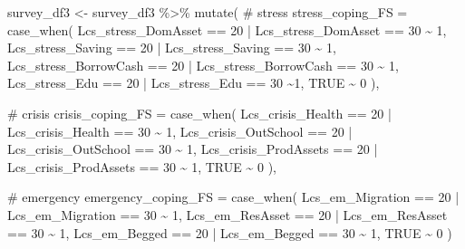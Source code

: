\documentclass[
  letterpaper,
  DIV=11,
  numbers=noendperiod]{scrreprt}
\newenvironment{Shaded}{\begin{snugshade}}{\end{snugshade}}
\newcommand{\AttributeTok}[1]{\textcolor[rgb]{0.40,0.45,0.13}{#1}}
\newcommand{\CommentTok}[1]{\textcolor[rgb]{0.37,0.37,0.37}{#1}}
\newcommand{\ConstantTok}[1]{\textcolor[rgb]{0.56,0.35,0.01}{#1}}
\newcommand{\DecValTok}[1]{\textcolor[rgb]{0.68,0.00,0.00}{#1}}
\newcommand{\FunctionTok}[1]{\textcolor[rgb]{0.28,0.35,0.67}{#1}}
\newcommand{\NormalTok}[1]{\textcolor[rgb]{0.00,0.23,0.31}{#1}}
\newcommand{\OtherTok}[1]{\textcolor[rgb]{0.00,0.23,0.31}{#1}}
\newcommand{\SpecialCharTok}[1]{\textcolor[rgb]{0.37,0.37,0.37}{#1}}
\begin{document}
\begin{Shaded}
\begin{Highlighting}[]
\NormalTok{survey\_df3 }\OtherTok{\textless{}{-}}\NormalTok{ survey\_df3 }\SpecialCharTok{\%\textgreater{}\%} 
  \FunctionTok{mutate}\NormalTok{(}
    \CommentTok{\# stress}
    \AttributeTok{stress\_coping\_FS =} \FunctionTok{case\_when}\NormalTok{(}
\NormalTok{      Lcs\_stress\_DomAsset }\SpecialCharTok{==} \DecValTok{20} \SpecialCharTok{|}\NormalTok{  Lcs\_stress\_DomAsset }\SpecialCharTok{==} \DecValTok{30} \SpecialCharTok{\textasciitilde{}} \DecValTok{1}\NormalTok{,}
\NormalTok{      Lcs\_stress\_Saving }\SpecialCharTok{==} \DecValTok{20} \SpecialCharTok{|}\NormalTok{ Lcs\_stress\_Saving }\SpecialCharTok{==} \DecValTok{30} \SpecialCharTok{\textasciitilde{}} \DecValTok{1}\NormalTok{,}
\NormalTok{      Lcs\_stress\_BorrowCash }\SpecialCharTok{==} \DecValTok{20} \SpecialCharTok{|}\NormalTok{ Lcs\_stress\_BorrowCash }\SpecialCharTok{==} \DecValTok{30} \SpecialCharTok{\textasciitilde{}} \DecValTok{1}\NormalTok{,}
\NormalTok{      Lcs\_stress\_Edu }\SpecialCharTok{==} \DecValTok{20} \SpecialCharTok{|}\NormalTok{ Lcs\_stress\_Edu }\SpecialCharTok{==} \DecValTok{30} \SpecialCharTok{\textasciitilde{}}\DecValTok{1}\NormalTok{,}
      \ConstantTok{TRUE} \SpecialCharTok{\textasciitilde{}} \DecValTok{0}
\NormalTok{    ),}
    
    \CommentTok{\# crisis}
    \AttributeTok{crisis\_coping\_FS =} \FunctionTok{case\_when}\NormalTok{(}
\NormalTok{      Lcs\_crisis\_Health }\SpecialCharTok{==} \DecValTok{20} \SpecialCharTok{|}\NormalTok{  Lcs\_crisis\_Health }\SpecialCharTok{==} \DecValTok{30} \SpecialCharTok{\textasciitilde{}} \DecValTok{1}\NormalTok{,}
\NormalTok{      Lcs\_crisis\_OutSchool }\SpecialCharTok{==} \DecValTok{20} \SpecialCharTok{|}\NormalTok{ Lcs\_crisis\_OutSchool }\SpecialCharTok{==} \DecValTok{30} \SpecialCharTok{\textasciitilde{}} \DecValTok{1}\NormalTok{,}
\NormalTok{      Lcs\_crisis\_ProdAssets }\SpecialCharTok{==} \DecValTok{20} \SpecialCharTok{|}\NormalTok{ Lcs\_crisis\_ProdAssets }\SpecialCharTok{==} \DecValTok{30} \SpecialCharTok{\textasciitilde{}} \DecValTok{1}\NormalTok{,}
      \ConstantTok{TRUE} \SpecialCharTok{\textasciitilde{}} \DecValTok{0}
\NormalTok{    ),}
    
    \CommentTok{\# emergency}
    \AttributeTok{emergency\_coping\_FS =} \FunctionTok{case\_when}\NormalTok{(}
\NormalTok{      Lcs\_em\_Migration }\SpecialCharTok{==} \DecValTok{20} \SpecialCharTok{|}\NormalTok{  Lcs\_em\_Migration }\SpecialCharTok{==} \DecValTok{30} \SpecialCharTok{\textasciitilde{}} \DecValTok{1}\NormalTok{,}
\NormalTok{      Lcs\_em\_ResAsset }\SpecialCharTok{==} \DecValTok{20} \SpecialCharTok{|}\NormalTok{ Lcs\_em\_ResAsset }\SpecialCharTok{==} \DecValTok{30} \SpecialCharTok{\textasciitilde{}} \DecValTok{1}\NormalTok{,}
\NormalTok{      Lcs\_em\_Begged }\SpecialCharTok{==} \DecValTok{20} \SpecialCharTok{|}\NormalTok{ Lcs\_em\_Begged }\SpecialCharTok{==} \DecValTok{30} \SpecialCharTok{\textasciitilde{}} \DecValTok{1}\NormalTok{,}
      \ConstantTok{TRUE} \SpecialCharTok{\textasciitilde{}} \DecValTok{0}
\NormalTok{    )}
    

\end{Highlighting}
\end{Shaded}
\end{document}
